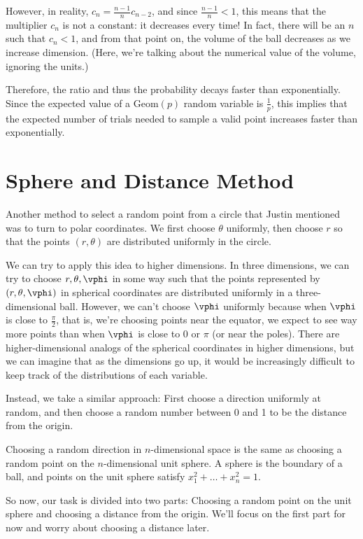 \documentclass{article}
\begin{document}
However, in reality, $c_n = \frac{n-1}{n}c_{n-2}$, and since $\frac{n-1}{n} < 1$, this means that the multiplier $c_n$ is not a constant: it decreases every time! In fact, there will be an $n$ such that $c_n < 1$, and from that point on, the volume of the ball decreases as we increase dimension. (Here, we're talking about the numerical value of the volume, ignoring the units.)

Therefore, the ratio and thus the probability decays faster than exponentially. Since the expected value of a $\mathrm{Geom}(p)$ random variable is $\frac{1}{p}$, this implies that the expected number of trials needed to sample a valid point increases faster than exponentially.

\section{Sphere and Distance Method}

Another method to select a random point from a circle that Justin mentioned was to turn to polar coordinates. We first choose $\theta$ uniformly, then choose $r$ so that the points $(r, \theta)$ are distributed uniformly in the circle.

We can try to apply this idea to higher dimensions. In three dimensions, we can try to choose $r, \theta, \vphi$ in some way such that the points represented by $(r, \theta, \vphi)$ in spherical coordinates are distributed uniformly in a three-dimensional ball. However, we can't choose $\vphi$ uniformly because when $\vphi$ is close to $\frac{\pi}{2}$, that is, we're choosing points near the equator, we expect to see way more points than when $\vphi$ is close to 0 or $\pi$ (or near the poles). There are higher-dimensional analogs of the spherical coordinates in higher dimensions, but we can imagine that as the dimensions go up, it would be increasingly difficult to keep track of the distributions of each variable.

Instead, we take a similar approach: First choose a direction uniformly at random, and then choose a random number between 0 and 1 to be the distance from the origin.

Choosing a random direction in $n$-dimensional space is the same as choosing a random point on the $n$-dimensional unit sphere. A sphere is the boundary of a ball, and points on the unit sphere satisfy $x_1^2 + \ldots + x_n^2 = 1$.

So now, our task is divided into two parts: Choosing a random point on the unit sphere and choosing a distance from the origin. We'll focus on the first part for now and worry about choosing a distance later.
\end{document}
